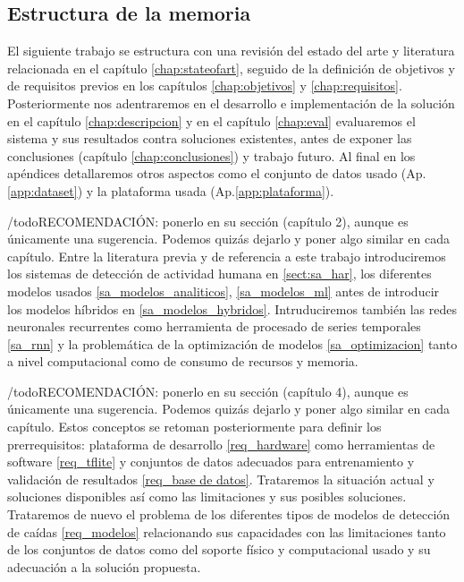 \documentclass[../tfm.tex]{subfiles}
\begin{document}
\subsection{Estructura de la memoria}

El siguiente trabajo se estructura con una revisión del estado del arte y literatura relacionada en el capítulo \ref{chap:stateofart}, seguido de la definición de objetivos y de requisitos previos en los capítulos \ref{chap:objetivos} y \ref{chap:requisitos}. Posteriormente nos adentraremos en el desarrollo e implementación de la solución en el capítulo \ref{chap:descripcion} y en el capítulo \ref{chap:eval} evaluaremos el sistema y sus resultados contra soluciones existentes, antes de exponer las conclusiones (capítulo \ref{chap:conclusiones}) y trabajo futuro. Al final en los apéndices detallaremos otros aspectos como el conjunto de datos usado (Ap.\ref{app:dataset}) y la plataforma usada (Ap.\ref{app:plataforma}).


/todo{RECOMENDACIÓN: ponerlo en su sección (capítulo 2), aunque es únicamente una sugerencia. Podemos quizás dejarlo y poner algo similar en cada capítulo.} Entre la literatura previa y de referencia a este trabajo introduciremos los sistemas de detección de actividad humana en \ref{sect:sa_har}, los diferentes modelos usados \ref{sa_modelos_analiticos}, \ref{sa_modelos_ml} antes de introducir los modelos híbridos en \ref{sa_modelos_hybridos}. Intruduciremos también las redes neuronales recurrentes como herramienta de procesado de series temporales \ref{sa_rnn} y la problemática de la optimización de modelos \ref{sa_optimizacion} tanto a nivel computacional como de consumo de recursos y memoria.

/todo{RECOMENDACIÓN: ponerlo en su sección (capítulo 4), aunque es únicamente una sugerencia. Podemos quizás dejarlo y poner algo similar en cada capítulo.} Estos conceptos se retoman posteriormente para definir los prerrequisitos: plataforma de desarrollo \ref{req_hardware} como herramientas de software \ref{req_tflite} y conjuntos de datos adecuados para entrenamiento y validación de resultados \ref{req_base de datos}. Trataremos la situación actual y soluciones disponibles así como las limitaciones y sus posibles soluciones. Trataremos de nuevo el problema de los diferentes tipos de modelos de detección de caídas \ref{req_modelos} relacionando sus capacidades con las limitaciones tanto de los conjuntos de datos como del soporte físico y computacional usado y su adecuación a la solución propuesta.
\end{document}
